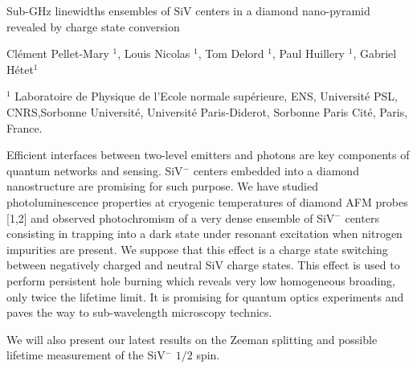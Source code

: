 \documentclass[a4paper,11pt]{article}
\begin{document}

\Large
 \begin{center}
Sub-GHz linewidths ensembles of SiV centers in a diamond nano-pyramid revealed by charge state conversion

\hspace{10pt}

\normalsize
Cl{\'e}ment Pellet-Mary $^1$, Louis Nicolas $^1$, Tom Delord $^1$, Paul Huillery $^1$, Gabriel H{\'e}tet$^1$\\

\hspace{10pt}

\small  
$^1$ Laboratoire de Physique de l'Ecole normale sup{\'e}rieure, ENS, Université PSL, CNRS,Sorbonne Universit{\'e}, Universit{\'e} Paris-Diderot, Sorbonne Paris Cit{\'e}, Paris, France.\\


\end{center}

\hspace{10pt}

\normalsize

\noindent
Efficient interfaces between two-level emitters and photons are key components of quantum networks and sensing. %
SiV$^-$ centers embedded into a diamond nanostructure are promising for such purpose. We have studied photoluminescence properties at cryogenic temperatures of diamond AFM probes [1,2] and observed photochromism of a very dense ensemble of SiV$^-$ centers consisting in trapping into a dark state under resonant excitation when nitrogen impurities are present. We suppose that this effect is a charge state switching between negatively charged and neutral SiV charge states.  This effect is used to perform persistent hole burning which reveals very low homogeneous broading, only twice the lifetime limit. It is promising  for quantum optics experiments and paves the way to sub-wavelength microscopy technics. %

We will also present our latest results on the Zeeman splitting and possible lifetime measurement of the SiV$^-$ $1/2$ spin. 
\end{document}
